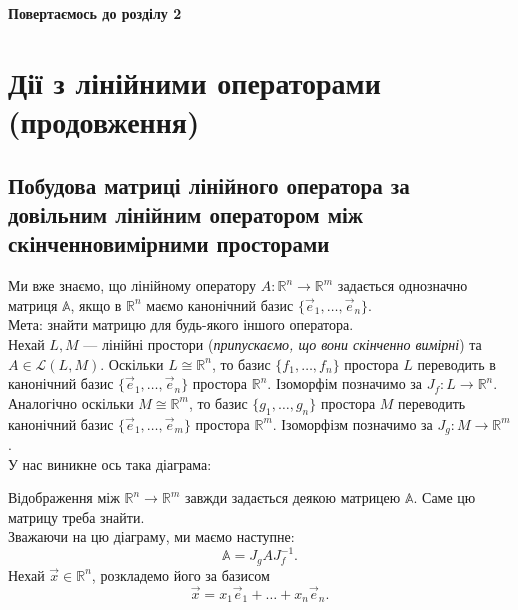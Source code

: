 \documentclass{math_library}
\begin{document}
\begin{center}
\textbf{Повертаємось до розділу 2}
\end{center}
\newpage

{}
\setcounter{section}{1}
\section{Дії з лінійними операторами (продовження)}
\setcounter{subsection}{6}
\subsection{Побудова матриці лінійного оператора за довільним лінійним оператором між скінченновимірними просторами}
	Ми вже знаємо, що лінійному оператору $A \colon \mathbb{R}^n \to \mathbb{R}^m$ задається однозначно матриця $\mathbb{A}$, якщо в $\mathbb{R}^n$ маємо канонічний базис $\{\vec{e}_1,\dots,\vec{e}_n \}$.\\
	Мета: знайти матрицю для будь-якого іншого оператора.
	\bigskip \\
	Нехай $L,M$ --- лінійні простори (\textit{припускаємо, що вони скінченно вимірні}) та $A \in \mathcal{L}(L,M)$. Оскільки  $L \cong \mathbb{R}^n$, то базис $\{f_1,\dots,f_n\}$ простора $L$ переводить в канонічний базис $\{\vec{e}_1,\dots,\vec{e}_n\}$ простора $\mathbb{R}^n$. Ізоморфім позначимо за $J_f \colon L \to \mathbb{R}^n$. Аналогічно оскільки $M \cong \mathbb{R}^m$, то базис $\{g_1,\dots,g_n\}$ простора $M$ переводить канонічний базис $\{\vec{e}_1,\dots,\vec{e}_m\}$ простора $\mathbb{R}^m$. Ізоморфізм позначимо за $J_g \colon M \to \mathbb{R}^m$.\\
	У нас виникне ось така діаграма:
	\begin{center}
	\end{center}
	Відображення між $\mathbb{R}^n \to \mathbb{R}^m$ завжди задається деякою матрицею $\mathbb{A}$. Саме цю матрицу треба знайти.\\
	Зважаючи на цю діаграму, ми маємо наступне:
	\[
	\mathbb{A} = J_g A J_f^{-1}.
	\]
	Нехай $\vec{x} \in \mathbb{R}^n$, розкладемо його за базисом
	\[
	\vec{x} = x_1 \vec{e}_1+ \dots + x_n \vec{e}_n.
	\]
\end{document}
